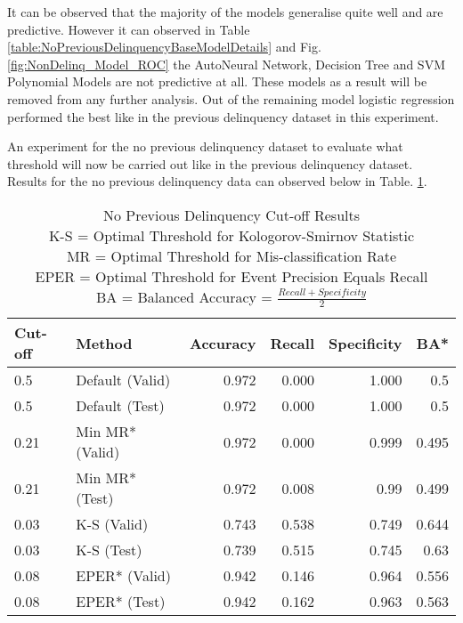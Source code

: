 It can be observed that the majority of the models generalise quite well and are predictive. However it can observed in Table \ref{table:NoPreviousDelinquencyBaseModelDetails} and Fig. \ref{fig:NonDelinq_Model_ROC} the AutoNeural Network, Decision Tree and SVM Polynomial Models are not predictive at all. These models as a result will be removed from any further analysis. Out of the remaining model logistic regression performed the best like in the previous delinquency dataset in this experiment. 

An experiment for the no previous delinquency dataset to evaluate what threshold will now be carried out like in the previous delinquency dataset. Results for the no previous delinquency data can observed below in Table. \ref{table:NoDelinquencyModelCutoff}.

\begin{table}[H]
	\centering
	\small
		\begin{tabular}{|l|l|r|r|r|r|}
			\hline
			\textbf{Cut-off} & \textbf{Method} & \textbf{Accuracy} & \textbf{Recall} & \textbf{Specificity}  & \textbf{BA*}  \\ \hline
			0.5             & Default (Valid)  & 0.972             & 0.000           & 1.000                  & 0.5     \\
			0.5             & Default (Test)   & 0.972             & 0.000           & 1.000                  & 0.5     \\ \hline
			
			0.21            & Min MR* (Valid)   & 0.972             & 0.000           & 0.999                    & 0.495   \\
			0.21            & Min MR* (Test)    & \cellcolor{yellow!25}0.972             & 0.008                         & \cellcolor{yellow!25}0.99  & 0.499     \\ \hline
			
			0.03            & K-S (Valid)      & 0.743             & 0.538           & 0.749                 & 0.644     \\
			0.03            & K-S (Test)       & 0.739             & \cellcolor{yellow!25}0.515                          & 0.745  & \cellcolor{yellow!25}0.63     \\ \hline
			
			0.08            & EPER* (Valid)     & 0.942             & 0.146           & 0.964                   & 0.556   \\
			0.08            & EPER* (Test)      & 0.942             & 0.162           & 0.963                 & 0.563     \\ \hline
		\end{tabular}
	\caption{No Previous Delinquency Cut-off Results
			\\ K-S = Optimal Threshold for Kologorov-Smirnov Statistic
			\\ MR = Optimal Threshold for Mis-classification Rate
			\\ EPER = Optimal Threshold for Event Precision Equals Recall
			\\ BA = Balanced Accuracy = $\frac{Recall + Specificity }{2}$
			}
	\label{table:NoDelinquencyModelCutoff}
\end{table}

